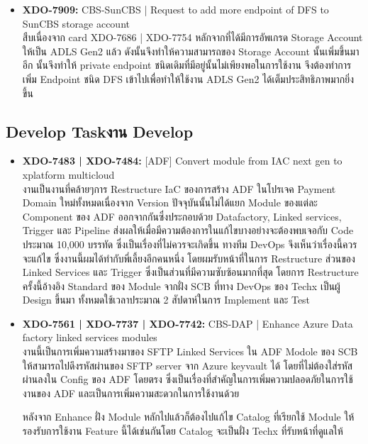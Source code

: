 \begin{itemize}
      \item \textbf{XDO-7909:} CBS-SunCBS | Request to add more endpoint of DFS to SunCBS storage account\\
            สืบเนื่องจาก card XDO-7686 | XDO-7754 หลักจากที่ได้มีการอัพเกรด Storage Account ให้เป็น ADLS Gen2 แล้ว ดังนั้นจึงทำให้ความสามารถของ Storage Account นั้นเพิ่มขึ้นมาอีก นั้นจึงทำให้ private endpoint ชนิดเดิมที่มีอยู่นั้นไม่เพียงพอในการใช้งาน จึงต้องทำการเพิ่ม Endpoint ชนิด DFS เข้าไปเพื่อทำให้ใช้งาน ADLS Gen2 ได้เต็มประสิทธิภาพมากยิ่งขึ้น
\end{itemize}

\subsection{\ifenglish Develop Task\else งาน Develop\fi}
\begin{itemize}
      \item \textbf{XDO-7483 | XDO-7484:} [ADF] Convert module from IAC next gen to xplatform multicloud\\
            งานเป็นงานที่คล้ายๆการ Restructure IaC ของการสร้าง ADF ในโปรเจค Payment Domain ใหม่ทั้งหมดเนื่องจาก Version ปัจจุบันนั้นไม่ได้แยก Module ของแต่ละ Component ของ ADF ออกจากกันซึ่งประกอบด้วย Datafactory, Linked services, Trigger และ Pipeline ส่งผลให้เมื่อมีความต้องการในแก้ไขบางอย่างจะต้องพบเจอกับ Code ประมาณ 10,000 บรรทัด ซึ่งเป็นเรื่องที่ไม่ควรจะเกิดขึ้น ทางทีม DevOps จึงเห็นว่าเรื่องนี้ควรจะแก้ไข ซึ่งงานนี้ผมได้ทำกับพี่เลี้ยงอีกคนหนึ่ง โดยผมรับหน้าที่ในการ Restructure ส่วนของ Linked Services และ Trigger ซึ่งเป็นส่วนที่มีความซับซ้อนมากที่สุด โดยการ Restructure ครั้งนี้อ้างอิง Standard ของ Module จากฝั่ง SCB ที่ทาง DevOps ของ Techx เป็นผู้ Design ขึ้นมา ทั้งหมดใช้เวลาประมาณ 2 สัปดาห์ในการ Implement และ Test
      \item \textbf{XDO-7561 | XDO-7737 | XDO-7742:} CBS-DAP | Enhance Azure Data factory linked services modules\\
            งานนี้เป็นการเพิ่มความสร้างมาของ SFTP Linked Services ใน ADF Modole ของ SCB ให้สามารถไปดึงรหัสผ่านของ SFTP server จาก Azure keyvault ได้ โดยที่ไม่ต้องใส่รหัสผ่านลงใน Config ของ ADF โดยตรง ซึ่งเป็นเรื่องที่สำคัญในการเพิ่มความปลอดภัยในการใช้งานของ ADF และเป็นการเพิ่มความสะดวกในการใช้งานด้วย

            หลังจาก Enhance ฝั่ง Module หลักไปแล้วก็ต้องไปแก้ไข Catalog ที่เรียกใช้ Module ให้รองรับการใช้งาน Feature นี้ได้เช่นกันโดย Catalog จะเป็นฝั่ง Techx ที่รับหน้าที่ดูแลให้


\end{itemize}
